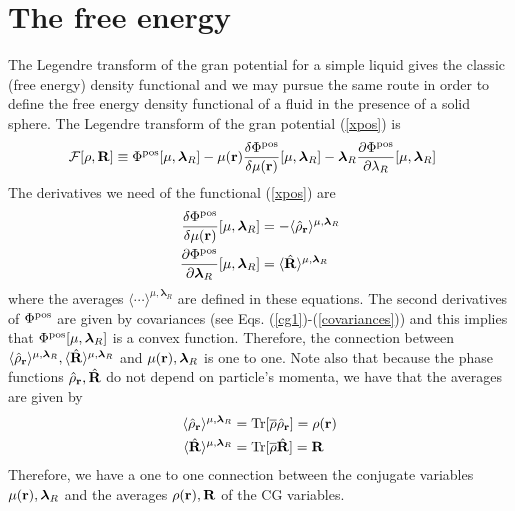 \documentclass[b5paper,openright,11pt]{book}
\begin{document}
\section{The free energy}
The Legendre transform of the gran potential for a simple liquid gives the classic (free energy) density functional and we may pursue the same route in order to define the free energy density functional of a fluid in the presence of a solid sphere. The Legendre transform of the gran potential (\ref{xpos}) is
\begin{align}
  {\cal F}[\rho,{\bf R}]&\equiv  \Phi^{\rm pos}[\mu,\boldsymbol{\lambda}_R]
-\mu({\bf r})\frac{\delta\Phi^{\rm pos}}{\delta\mu({\bf r})}[\mu,\boldsymbol{\lambda}_R] 
-\boldsymbol{\lambda}_R\frac{\partial \Phi^{\rm pos}}{\partial \lambda_R}[\mu,\boldsymbol{\lambda}_R] 
\label{legPrev}
\end{align}
The derivatives we need of the functional (\ref{xpos}) are
\begin{align}
 \frac{\delta \Phi^{\rm pos}}{\delta \mu({\bf r})}[\mu,\boldsymbol{\lambda}_R]&=-
\langle \hat{\rho}_{\bf r}\rangle^{\mu,\boldsymbol{\lambda}_R}
\nonumber\\
  \frac{\partial \Phi^{\rm pos}}{\partial \boldsymbol{\lambda}_R}[\mu,\boldsymbol{\lambda}_R]&=
\langle \hat{\bf R}\rangle^{\mu,\boldsymbol{\lambda}_R}
\end{align}
where               the                averages               $\langle
\cdots\rangle^{\mu,\boldsymbol{\lambda}_R}$   are  defined   in  these
equations.  The second  derivatives of $ \Phi^{\rm pos}$  are given by
covariances  (see   Eqs.  (\ref{cg1})-(\ref{covariances}))   and  this
implies that $\Phi^{\rm  pos}[\mu,\boldsymbol{\lambda}_R]$ is a convex
function.  Therefore, the  connection between $\langle \hat{\rho}_{\bf
  r}\rangle^{\mu,\boldsymbol{\lambda}_R},       \langle       \hat{\bf
  R}\rangle^{\mu,\boldsymbol{\lambda}_R}$         and        $\mu({\bf
  r}),\boldsymbol{\lambda}_R$ is  one to  one. Note also  that because
the phase functions  $ \hat{\rho}_{\bf r}, \hat{\bf R}$  do not depend
on particle's momenta, we have that the averages are given by
\begin{align}
  \langle \hat{\rho}_{\bf r}\rangle^{\mu,\boldsymbol{\lambda}_R} &={\rm Tr}[\overline{\rho}\hat{\rho}_{\bf r}]=\rho({\bf r})
\nonumber\\
  \langle \hat{\bf R}\rangle^{\mu,\boldsymbol{\lambda}_R} &={\rm Tr}[\overline{\rho}\hat{\bf R}]={\bf R}
\end{align}
Therefore,  we have  a one  to  one connection  between the  conjugate
variables  $\mu({\bf  r}),\boldsymbol{\lambda}_R$   and  the  averages
$\rho({\bf  r}),{\bf  R}$  of  the  CG  variables.
\end{document}
